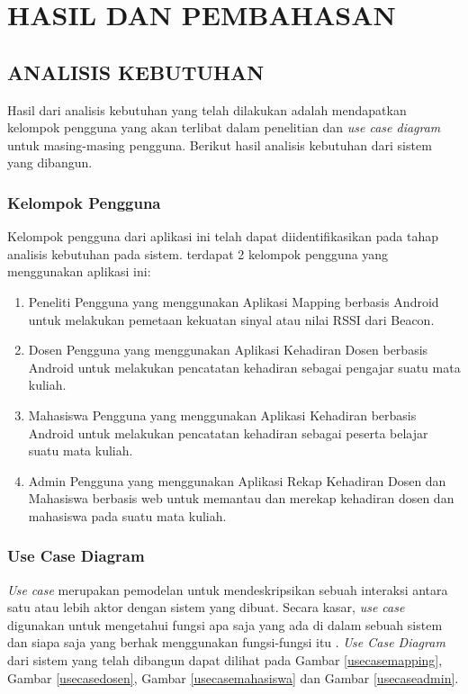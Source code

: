 \chapter{HASIL DAN PEMBAHASAN}
\section{\uppercase{ANALISIS KEBUTUHAN}}

Hasil dari analisis kebutuhan yang telah dilakukan adalah mendapatkan kelompok pengguna yang akan terlibat dalam penelitian dan \textit{use case diagram} untuk masing-masing pengguna. Berikut hasil analisis kebutuhan dari sistem yang dibangun.

\subsection{Kelompok Pengguna}
Kelompok pengguna dari aplikasi ini telah dapat diidentifikasikan pada tahap analisis kebutuhan pada sistem. terdapat 2 kelompok pengguna yang menggunakan aplikasi ini:
\begin{enumerate}[1.]
	\item Peneliti
	      \newline Pengguna yang menggunakan Aplikasi Mapping berbasis Android untuk melakukan pemetaan kekuatan sinyal atau nilai RSSI dari Beacon.
	\item Dosen
	      \newline Pengguna yang menggunakan Aplikasi Kehadiran Dosen berbasis Android untuk melakukan pencatatan kehadiran sebagai pengajar suatu mata kuliah.
	\item Mahasiswa
	      \newline Pengguna yang menggunakan Aplikasi Kehadiran berbasis Android untuk melakukan pencatatan kehadiran sebagai peserta belajar suatu mata kuliah.
	\item Admin
	      \newline Pengguna yang menggunakan Aplikasi Rekap Kehadiran Dosen dan Mahasiswa berbasis web untuk memantau dan merekap kehadiran dosen dan mahasiswa pada suatu mata kuliah.
\end{enumerate}

\subsection{Use Case Diagram}
\textit{Use case} merupakan pemodelan untuk mendeskripsikan sebuah interaksi antara satu atau lebih aktor dengan sistem yang dibuat. Secara kasar, \textit{use case} digunakan untuk mengetahui fungsi apa saja yang ada di dalam sebuah sistem dan siapa saja yang berhak menggunakan fungsi-fungsi itu \citep{Rosa2015}. \textit{Use Case Diagram} dari sistem yang telah dibangun dapat dilihat pada Gambar \ref{usecasemapping}, Gambar \ref{usecasedosen}, Gambar \ref{usecasemahasiswa} dan Gambar \ref{usecaseadmin}.

